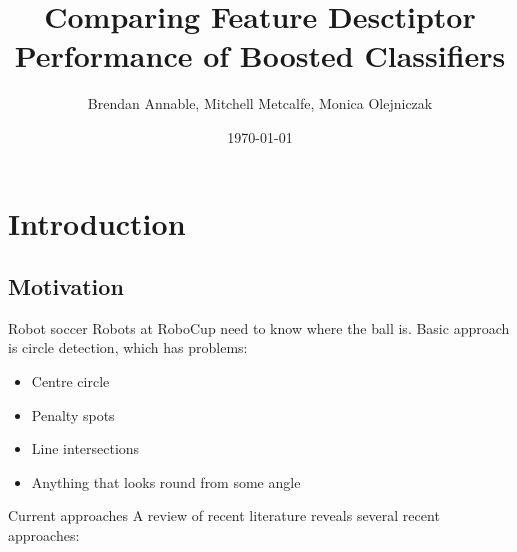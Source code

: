 \documentclass{beamer}
\title{Comparing Feature Desctiptor Performance of Boosted Classifiers }
\author{Brendan Annable, Mitchell Metcalfe, Monica Olejniczak}
\institute{The University of Newcastle, Australia}
\date{\today}
\begin{document}
	\maketitle

	

\section{Introduction}

	\subsection{Motivation}

	\begin{frame}{Robot soccer}
		Robots at RoboCup \citep{KitanoAKNO97} need to know where the ball is. Basic approach is circle detection, which has problems: \\
		\begin{itemize}
			\item Centre circle
	        \item Penalty spots
	        \item Line intersections
	        \item Anything that looks round from some angle
		\end{itemize}
	\end{frame}

	\begin{frame}{Current approaches}
		A review of recent literature reveals several recent approaches:
	\end{frame}
\end{document}
